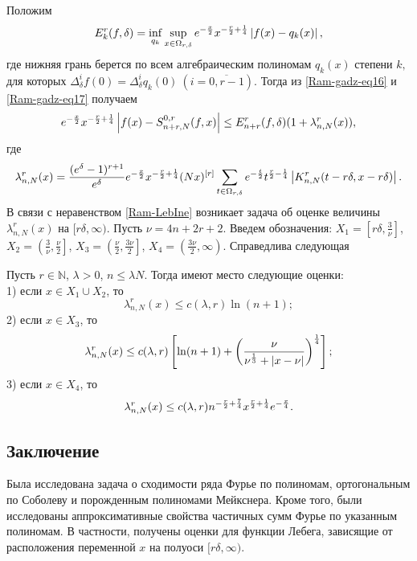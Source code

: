 Положим
\begin{equation}\label{Ram-gadz-eq17}
E_{k}^r(f,\delta)=\inf_{q_{k}}\sup_{x\in\Omega_{r,\delta}} e^{-{x\over 2}}x^{-{r\over 2}+{1\over 4}}\left|f(x)-q_{k}(x)\right|,
\end{equation}
где нижняя грань берется по всем алгебраическим полиномам $q_{k}(x)$ степени $k,$ для которых $\Delta_\delta^i f(0)=\Delta_\delta^i q_{k}(0)\ (i=\overline{0, r-1}).$
Тогда из \eqref{Ram-gadz-eq16} и \eqref{Ram-gadz-eq17} получаем
\begin{equation}\label{Ram-LebIne}
e^{-{x\over 2}}x^{-{r\over 2}+{1\over 4}}\left|f(x)-S_{n+r,N}^{0,r}(f,x)\right|\leq E_{n+r}^r(f,\delta)(1+\lambda_{n,N}^{r}(x)),
\end{equation}
где
$$
\lambda_{n,N}^{r}(x)=\frac{(e^{\delta}-1)^{r+1}}{e^\delta}e^{-{x\over 2}}x^{-{r\over 2}+{1\over 4}}(Nx)^{[r]}
\sum_{t\in\Omega_{r,\delta}}e^{-{t\over 2}}t^{{r\over 2}-{1\over 4}}
\left|K_{n,N}^r(t-r\delta,x-r\delta)\right|.
$$
В связи с неравенством \eqref{Ram-LebIne} возникает задача об оценке величины $\lambda_{n,N}^{r}(x)$ на $[r\delta,\infty)$. Пусть $\nu=4n+2r+2$. Введем обозначения:
$X_1=\left[r\delta, \frac{3}{\nu}\right]$,
$X_2=\left(\frac{3}{\nu}, \frac{\nu}{2}\right]$,
$X_3=\left(\frac{\nu}{2}, \frac{3\nu}{2}\right]$,
$X_4=\left(\frac{3\nu}{2}, \infty\right)$.
Справедлива следующая
\begin{theorem}\label{Ram-theoMex2}
Пусть $r\in\mathbb{N}$, $\lambda> 0$, $n\leq\lambda N.$ Тогда имеют место следующие оценки:\\
1) если $x\in X_1\cup X_2$, то
$$
\lambda_{n,N}^{r}(x)\leq c(\lambda, r)\ln (n+1);
$$
2) если $x\in X_3$, то
$$
\lambda_{n,N}^{r}(x)\leq c(\lambda,r)\left[\ln(n+1)+\left(\frac{\nu}{\nu^{1\over3}+|x-\nu|}\right)^{\frac{1}{4}}\right];
$$
3) если $x\in X_4$, то
$$
\lambda_{n,N}^{r}(x)\leq c(\lambda,r)n^{-{r\over 2}+{7\over 4}}x^{{r\over 2}+{1\over 4}}e^{-\frac{x}{4}}.
$$
\end{theorem}

\subsection{Заключение}
Была исследована задача о сходимости ряда Фурье по полиномам, ортогональным по Соболеву и порожденным полиномами Мейкснера.
Кроме того, были исследованы аппроксимативные свойства частичных сумм Фурье по указанным полиномам. В частности, получены оценки для функции Лебега, зависящие от расположения переменной $x$ на полуоси $[r\delta, \infty)$.




	




